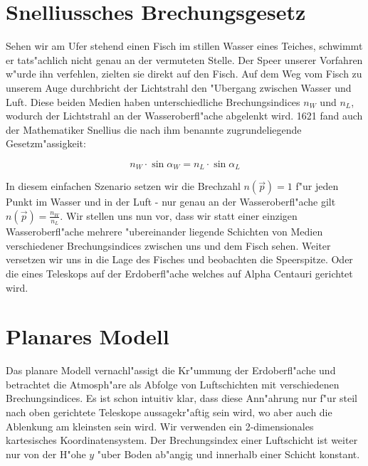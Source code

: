 \begin{refsection}
\section{Snelliussches Brechungsgesetz} 


Sehen wir am Ufer stehend einen Fisch im stillen Wasser eines Teiches, schwimmt er tats"achlich nicht genau an der vermuteten Stelle. 
Der Speer unserer Vorfahren w"urde ihn verfehlen, zielten sie direkt auf den Fisch.
Auf dem Weg vom Fisch zu unserem Auge durchbricht der Lichtstrahl den "Ubergang zwischen Wasser und Luft. 
Diese beiden Medien haben unterschiedliche Brechungsindices $n_W$ und $n_L$, wodurch der Lichtstrahl an der Wasseroberfl"ache abgelenkt wird.
1621 fand auch der Mathematiker Snellius die nach ihm benannte zugrundeliegende Gesetzm"assigkeit:

\begin{equation} \label{eq:snellius}
n_W \cdot \sin \alpha_W = n_L \cdot \sin \alpha_L 
\end{equation}

In diesem einfachen Szenario setzen wir die Brechzahl $n(\vec{p}) = 1$ f"ur jeden Punkt im Wasser und in der Luft - nur genau an der Wasseroberfl"ache gilt $n(\vec{p}) = \frac{n_W}{n_L}$.
Wir stellen uns nun vor, dass wir statt einer einzigen Wasseroberfl"ache mehrere "ubereinander liegende Schichten von Medien verschiedener Brechungsindices zwischen uns und dem Fisch sehen.
Weiter versetzen wir uns in die Lage des Fisches und beobachten die Speerspitze. 
Oder die eines Teleskops auf der Erdoberfl"ache welches auf Alpha Centauri gerichtet wird.

\section{Planares Modell} 

Das planare Modell vernachl"assigt die Kr"ummung der Erdoberfl"ache und betrachtet die Atmosph"are als Abfolge von Luftschichten mit verschiedenen Brechungsindices. 
Es ist schon intuitiv klar, dass diese Ann"ahrung nur f"ur steil nach oben gerichtete Teleskope aussagekr"aftig sein wird, wo aber auch die Ablenkung am kleinsten sein wird.
Wir verwenden ein 2-dimensionales kartesisches Koordinatensystem. 
Der Brechungsindex einer Luftschicht ist weiter nur von der H"ohe $y$ "uber Boden ab"angig und innerhalb einer Schicht konstant.


\end{refsection}
